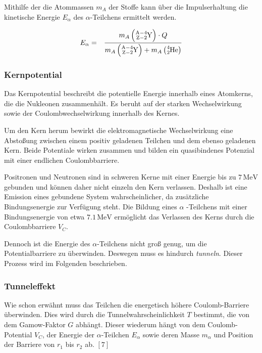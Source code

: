 \documentclass[12pt,a4paper]{scrartcl}
\numberwithin{equation}{section} %
\renewcommand{\[}{} %
\renewcommand{\]}{\noindent} %
\begin{document}
Mithilfe der die Atommassen \(m_{A}\) der Stoffe kann über die
Impulserhaltung die kinetische Energie \(E_\alpha\) des
\(\alpha\)-Teilchens ermittelt werden.

\[
\begin{eqnarray}
    E_\alpha
        &=& \frac{m_{A}\left(\ce{^{A-4}_{Z-2}Y}\right) \cdot Q}
            {m_{A}\left(\ce{^{A-4}_{Z-2}Y}\right)+m_{A}\left(\ce{^4_2He}\right)}
\end{eqnarray}
\]

\hypertarget{kernpotential}{%
\subsubsection{Kernpotential}\label{kernpotential}}

Das Kernpotential beschreibt die potentielle Energie innerhalb eines
Atomkerns, die die Nukleonen zusammenhält. Es beruht auf der starken
Wechselwirkung sowie der Coulombwechselwirkung innerhalb des Kernes.

Um den Kern herum bewirkt die elektromagnetische Wechselwirkung eine
Abstoßung zwischen einem positiv geladenen Teilchen und dem ebenso
geladenen Kern. Beide Potentiale wirken zusammen und bilden ein
quasibindenes Potenzial mit einer endlichen Coulombbarriere.

Positronen und Neutronen sind in schweren Kerne mit einer Energie bis zu
\(7\mathrm{\,MeV}\) gebunden und können daher nicht einzeln den Kern
verlassen. Deshalb ist eine Emission eines gebundene System
wahrscheinlicher, da zusätzliche Bindungsenergie zur Verfügung steht.
Die Bildung eines \(\alpha\) -Teilchens mit einer Bindungsenergie von
etwa \(7.1\mathrm{\,MeV}\) ermöglicht das Verlassen des Kerns durch die
Coulombbarriere \(V_C\).

Dennoch ist die Energie des \(\alpha\)-Teilchens nicht groß genug, um
die Potentialbarriere zu überwinden. Deswegen muss es hindurch
\emph{tunneln}. Dieser Prozess wird im Folgenden beschrieben.

\hypertarget{tunneleffekt}{%
\subsubsection{Tunneleffekt}\label{tunneleffekt}}

Wie schon erwähnt muss das Teilchen die energetisch höhere
Coulomb-Barriere überwinden. Dies wird durch die
Tunnelwahrscheinlichkeit \(T\) bestimmt, die von dem Gamow-Faktor \(G\)
abhängt. Dieser wiederum hängt von dem Coulomb-Potential \(V_C\), der
Energie der \(\alpha\)-Teilchen \(E_\alpha\) sowie deren Masse
\(m_\alpha\) und Position der Barriere von \(r_1\) bis \(r_2\) ab.
\([7]\)
\end{document}

